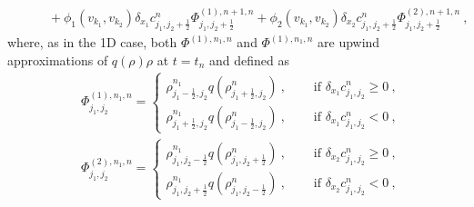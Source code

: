 \documentclass{aims} %
\theoremstyle{definition}
\begin{document}
{\begin{align*}
    & \qquad  + \phi_{1}(v_{k_1}, v_{k_2})\delta_{x_1} c_{j_1,j_2+\frac12}^n\Phi^{(1),n+1,n}_{j_1,j_2+\frac12} +\phi_{2}(v_{k_1}, v_{k_2}) \delta_{x_2} c_{j_1,j_2+\frac12}^n 
    \Phi^{(2),n+1,n}_{j_1,j_2+\frac12}
    \ ,
\end{align*}
where, as in the 1D case, both $\Phi^{(1), n_1,n}$ and $\Phi^{(1), n_1,n}$ are upwind approximations of $q(\rho)\rho$ at $t=t_n$ and defined as 
\begin{align*}
    & \Phi^{(1), n_1,n}_{j_1, j_2} = 
	\begin{cases}
		\rho_{j_1 - \frac12,j_2}^{n_1} q(\rho_{j_1+\frac12,j_2}^n)\ , \quad & \text{ if } \delta_{x_1} c_{j_1,j_2}^n \ge 0\ , \\
		\rho_{j_1+\frac12,j_2}^{n_1} q(\rho_{j_1-\frac12,j_2}^n)\ , \quad & \text{ if } \delta_{x_1} c_{j_1,j_2}^n <0\ , 
	\end{cases}\\
	& \Phi^{(2), n_1,n}_{j_1, j_2} = 
	\begin{cases}
		\rho_{j_1,j_2 - \frac12}^{n_1} q(\rho_{j_1,j_2+\frac12}^n)\ , \quad & \text{ if } \delta_{x_2} c_{j_1,j_2}^n \ge 0\ , \\
		\rho_{j_1,j_2+\frac12}^{n_1} q(\rho_{j_1,j_2-\frac12}^n)\ , \quad & \text{ if } \delta_{x_2} c_{j_1,j_2}^n <0\ ,
	\end{cases}
\end{align*}

}
\end{document}
